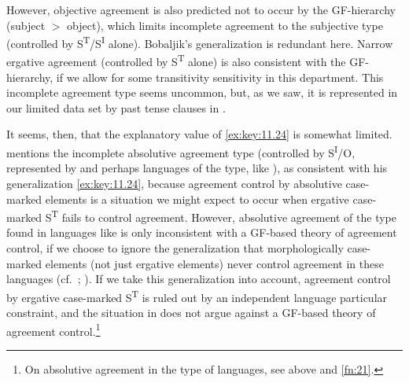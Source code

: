 \documentclass[output=paper]{langsci/langscibook}
\begin{document}
However, objective agreement is also predicted not to occur by the
\gls{GF}-hierarchy (subject $>$ object), which limits incomplete agreement to
the subjective type (controlled by S\textsuperscript{T}/S\textsuperscript{I}
alone). Bobaljik’s generalization is redundant here. Narrow ergative agreement
(controlled by S\textsuperscript{T} alone) is also consistent with the
\gls{GF}-hierarchy, if we allow for some transitivity sensitivity in this
department. This incomplete agreement type seems uncommon, but, as we saw, it
is represented in our limited data set by past tense clauses in  \citep[68]{Mulder1994}.

It seems, then, that the explanatory value of \eqref{ex:key:11.24} is somewhat
limited.  \citet{Bobaljik2008} mentions the incomplete absolutive agreement
type (controlled by S\textsuperscript{I}/O, represented by  and
perhaps languages of the  type, like ), as consistent
with his generalization \eqref{ex:key:11.24}, because agreement control by
absolutive case-marked elements is a situation we might expect to occur when
ergative case-marked S\textsuperscript{T} fails to control agreement. However,
absolutive agreement of the type found in languages like  is only
inconsistent with a \gls{GF}-based theory of agreement control, if we choose to
ignore the generalization that morphologically case-marked elements (not just
ergative elements) never control agreement in these languages (cf.\
\citealt[446]{Pandharipande1997}; \citealt{Woolford2000b}). If we take this
generalization into account, agreement control by ergative case-marked
S\textsuperscript{T} is ruled out by an independent language particular
constraint, and the situation in \ili{Marathi} does not argue against a
\gls{GF}-based theory of agreement control.\footnote{On absolutive agreement in
the \ili{Tsez} type of languages, see \Cref{sec:key:11.5.2} above and
\cref{fn:21}.}
\end{document}
